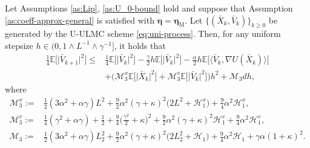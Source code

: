 \documentclass[10pt,a4paper]{amsart}
\renewcommand{\H}{\mathcal{H}}
\newcommand{\M}{\mathcal{M}}
\begin{document}
\begin{lem}
\label{lem:velocity-one-step}
Let Assumptions \ref{as:Lip}, \ref{as:U_0-bound} hold and suppose that Assumption \ref{as:coeff-approx-general} is satisfied with $\boldsymbol{\eta}=\boldsymbol{\eta}_{\mathrm M}$. Let $\{(\bar{X}_k,\bar{V}_k)\}_{k\geq0}$ be generated by the U-ULMC scheme \eqref{eq:uni-process}. Then, for any uniform stepsize $h\in(0,1\wedge L^{-1}\wedge\gamma^{-1}]$, it holds that
\begin{equation}
\label{eq:velocity-one-step}
\begin{aligned}
\tfrac{1}{4}
\mathbb{E}
\Big[
\big|
\bar{V}_{k+1}
\big|^2
\Big]
\leq&
\tfrac{1}{4}
\mathbb{E}
\Big[
\big|
\bar{V}_{k}
\big|^2
\Big]
-
\tfrac{\gamma}{2}h
\mathbb{E}
\Big[
\big|
\bar{V}_{k}
\big|^2
\Big]
-
\tfrac{\alpha}{2}h
\mathbb{E}
\Big[
\big\langle
\bar{V}_k,
\nabla U(\bar{X}_k)
\big\rangle
\Big]
\\
&+
\Big(
\M^x_3
\mathbb{E}
\Big[
\big|
\bar{X}_k
\big|^2
\Big]
+
\M^v_3
\mathbb{E}
\Big[
\big|
\bar{V}_k
\big|^2
\Big]
\Big)h^2
+
\M_3dh,
\end{aligned}
\end{equation}
where
\begin{equation}
\label{eq:M3-constants}
\begin{aligned}
\M^x_3
:=&
\tfrac{1}{2}
(3\alpha^2+\alpha\gamma)L^2
+
\tfrac{9}{2}
\alpha^2(\gamma+\kappa)^2
\big(
2L^2+\H_1^x
\big)
+
\tfrac{9}{4}
\alpha^2\H_1^x,
\\
\M^v_3
:=&
\tfrac{1}{4}
(\gamma^2+\alpha\gamma)
+
\tfrac{1}{2}
+
\tfrac{9}{4}
\big(
\tfrac{\gamma^2}{2}+\kappa
\big)^2
+
\tfrac{9}{2}
\alpha^2(\gamma+\kappa)^2
\H_1^v
+
\tfrac{9}{4}
\alpha^2\H_1^v,
\\
\M_3
:=&
\tfrac{1}{2}
(3\alpha^2+\alpha\gamma)
L_2^2
+
\tfrac{9}{2}
\alpha^2(\gamma+\kappa)^2
\big(
2L_2^2+\H_1
\big)
+
\tfrac{9}{4}
\alpha^2\H_1
+
\gamma\alpha(1+\kappa)^2.
\end{aligned}
\end{equation}
\end{lem}
\end{document}
